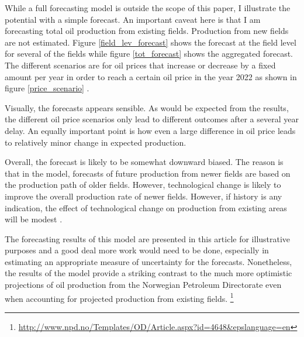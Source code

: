 \documentclass[12pt]{article}
\begin{document}
While a full forecasting model is outside the scope of this paper, I illustrate the potential with a simple forecast.  An important caveat here is that I am forecasting total oil production from existing fields.  Production from new fields are not estimated.  Figure \ref{field_lev_forecast} shows the forecast at the field level for several of the fields while figure \ref{tot_forecast} shows the aggregated forecast.  The different scenarios are for oil prices that increase or decrease by a fixed amount per year in order to reach a certain oil price in the year 2022 as shown in figure \ref{price_scenario} .  

Visually, the forecasts appears sensible.  As would be expected from the results, the different oil price scenarios only lead to different outcomes after a several year delay.  An equally important point is how even a large difference in oil price leads to relatively minor change in expected production.  

Overall, the forecast is likely to be somewhat downward biased.  The reason is that in the model, forecasts of future production from newer fields are based on the production path of older fields.  However, technological change is likely to improve the overall production rate of newer fields.  However, if history is any indication, the effect of technological change on production from existing areas will be modest \citep{hamilton_oil_2012}.

The forecasting results of this model are presented in this article for illustrative purposes and a good deal more work would need to be done, especially in estimating an appropriate measure of uncertainty for the forecasts.  Nonetheless, the results of the model provide a striking contrast to the much more optimistic projections of oil production from the Norwegian Petroleum Directorate even when accounting for projected production from existing fields. \footnote{\url{http://www.npd.no/Templates/OD/Article.aspx?id=4648&epslanguage=en}}
\end{document}
